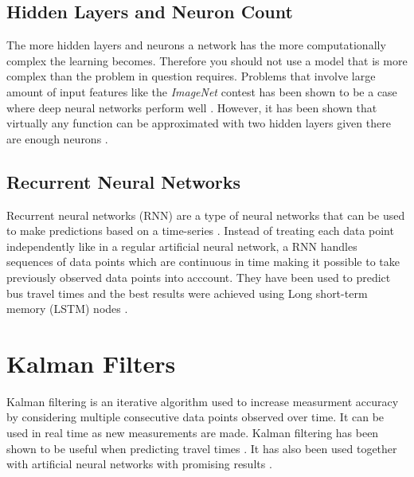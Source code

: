 \subsection{Hidden Layers and Neuron Count}
The more hidden layers and neurons a network has the more computationally complex the learning becomes. Therefore you should not use a model that is more complex than the problem in question requires. Problems that involve large amount of input features like the \textit{ImageNet} contest has been shown to be a case where deep neural networks perform well \cite{ImageNet}. However, it has been shown that virtually any function can be approximated with two hidden layers given there are enough neurons \cite{Demuth}.

\subsection{Recurrent Neural Networks}
Recurrent neural networks (RNN) are a type of neural networks that can be used to make predictions based on a time-series \cite{RNN}. Instead of treating each data point independently like in a regular artificial neural network, a RNN handles sequences of data points which are continuous in time making it possible to take previously observed data points into acccount. They have been used to predict bus travel times and the best results were achieved using Long short-term memory (LSTM) nodes \cite{RNNBusPredictions}.

\section{Kalman Filters}
Kalman filtering is an iterative algorithm used to increase measurment accuracy by considering multiple consecutive data points observed over time. It can be used in real time as new measurements are made. Kalman filtering has been shown to be useful when predicting travel times \cite{kalmanPrediction}. It has also been used together with artificial neural networks with promising results \cite{kalmanANN}.




